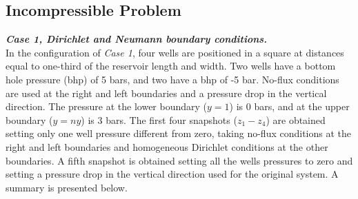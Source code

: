 \documentclass[12pt]{article}
\begin{document}
\newpage
\subsection*{Incompressible Problem}
\textbf{\emph{Case 1, Dirichlet and Neumann boundary conditions.}}\\
In the configuration of \emph{Case 1}, four wells are positioned in a square at distances equal 
to one-third of the reservoir length and width. Two wells have a bottom hole pressure (bhp) of 5 bars, and two have 
a bhp of -5 bar. No-flux conditions are used at the right and left boundaries and a pressure drop
in the vertical direction. The pressure at the lower boundary ($y=1$) is 0 bars, and at
the upper boundary ($y=ny$) is 3 bars. 
The first four snapshots ($z_1-z_4$) are obtained setting only one well pressure
different from zero, taking no-flux conditions at the right and left boundaries and 
homogeneous Dirichlet conditions at the other boundaries. A fifth snapshot is obtained 
setting all the wells pressures to zero and setting a pressure drop in the vertical 
direction used for the
original system. 
A summary is presented below.
\end{document}

